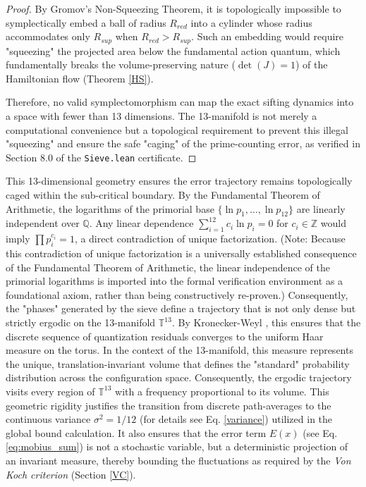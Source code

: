\documentclass[sn-mathphys-num, pdflatex]{sn-jnl}
\begin{document}
\begin{proof}
By Gromov's Non-Squeezing Theorem, it is topologically impossible to symplectically embed a ball of radius $R_{red}$ into a cylinder whose radius accommodates only $R_{sup}$ when $R_{red} > R_{sup}$. Such an embedding would require "squeezing" the projected area below the fundamental action quantum, which fundamentally breaks the volume-preserving nature ($\det(J)=1$) of the Hamiltonian flow (Theorem \ref{HS}). 

Therefore, no valid symplectomorphism can map the exact sifting dynamics into a space with fewer than 13 dimensions. The 13-manifold is not merely a computational convenience but a topological requirement to prevent this illegal "squeezing" and ensure the safe "caging" of the prime-counting error, as verified in Section 8.0 of the \texttt{Sieve.lean} certificate.
\end{proof}
This 13-dimensional geometry ensures the error trajectory remains topologically caged within the sub-critical boundary. By the Fundamental Theorem of Arithmetic, the logarithms of the primorial base $\{\ln p_1, \dots, \ln p_{12}\}$ are linearly independent over $\mathbb{Q}$. Any linear dependence $\sum_{i=1}^{12} c_i \ln p_i = 0$ for $c_i \in \mathbb{Z}$ would imply $\prod p_i^{c_i} = 1$, a direct contradiction of unique factorization. (Note: Because this contradiction of unique factorization is a universally established consequence of the Fundamental Theorem of Arithmetic, the linear independence of the primorial logarithms is imported into the formal verification environment as a foundational axiom, rather than being constructively re-proven.) Consequently, the "phases" generated by the sieve define a trajectory that is not only dense but strictly ergodic on the 13-manifold $\mathbb{T}^{13}$. By Kronecker-Weyl \cite{weyl}, this ensures that the discrete sequence of quantization residuals converges to the uniform Haar measure on the torus. In the context of the 13-manifold, this measure represents the unique, translation-invariant volume that defines the "standard" probability distribution across the configuration space. Consequently, the ergodic trajectory visits every region of $\mathbb{T}^{13}$ with a frequency proportional to its volume. This geometric rigidity justifies the transition from discrete path-averages to the continuous variance $\sigma^2 = 1/12$ (for details see Eq. \ref{variance}) utilized in the global bound calculation. It also ensures that the error term $E(x)$ (see Eq. \ref{eq:mobius_sum}) is not a stochastic variable, but a deterministic projection of an invariant measure, thereby bounding the fluctuations as required by the \textit{Von Koch criterion} (Section \ref{VC}).
\end{document}
